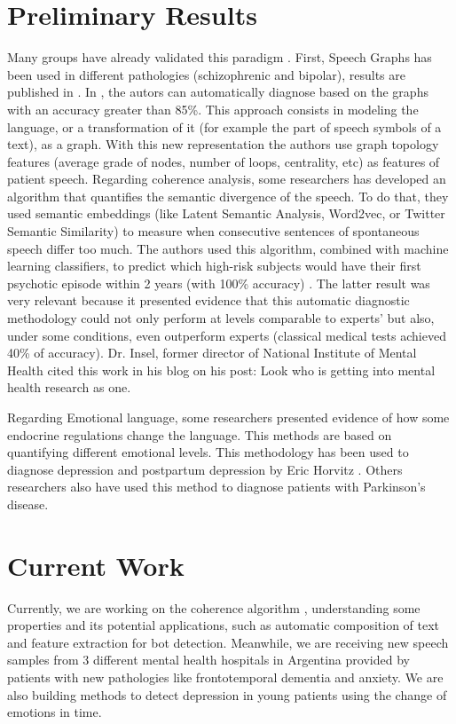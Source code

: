 \documentclass[11pt,a4paper]{article}
\begin{document}
\section{Preliminary Results}
Many groups have already validated this paradigm \cite{roark2011spoken,fraser2014automated,resnik2013using,lehr2012fully,fraser2016linguistic,mitchell2015quantifying}. First, Speech Graphs has been used in different pathologies (schizophrenic and bipolar), results are published in \cite{carrillo2014automated,mota2014graph,mota2012speech}. In \cite{carrillo2014automated}, the autors can automatically diagnose based on the graphs with an accuracy greater than 85\%. This approach consists in modeling the language, or a transformation of it (for example the part of speech symbols of a text), as a graph. With this new representation the authors use graph topology features (average grade of nodes, number of loops, centrality, etc) as features of patient speech. 
Regarding coherence analysis, some researchers has developed an algorithm that quantifies the semantic divergence of the speech. To do that, they used semantic embeddings (like Latent Semantic Analysis\cite{landauer1997solution}, Word2vec\cite{mikolov2013distributed}, or Twitter Semantic Similarity\cite{carrillo2015fast}) to measure when consecutive sentences of spontaneous speech differ too much. The authors used this algorithm, combined with machine learning classifiers, to predict which high-risk subjects would have their first psychotic episode within 2 years (with 100\% accuracy) \cite{bedi2015automated}. The latter result was very relevant because it presented evidence that this automatic diagnostic methodology could not only perform at levels comparable to experts’ but also, under some conditions, even outperform experts (classical medical tests achieved 40\% of accuracy). Dr. Insel, former director of National Institute of Mental Health  cited this work in his blog on his post: Look who is getting into mental health research as one.

Regarding Emotional language, some researchers presented evidence of how some endocrine regulations change the language. This methods are based on quantifying different emotional levels. This methodology has been used to diagnose depression and postpartum depression by Eric Horvitz \cite{de2013predicting}. Others researchers also have used this method to diagnose patients with Parkinson’s disease\cite{garcia2016language}.


\section{Current Work}
Currently, we are working on the coherence algorithm \cite{bedi2015automated}, understanding some properties and its potential applications, such as automatic composition of text and feature extraction for bot detection. Meanwhile, we are receiving new speech samples from 3 different mental health hospitals in Argentina provided by patients with new pathologies like frontotemporal dementia and anxiety. We are also building methods to detect depression in young patients using the change of emotions in time.
\end{document}
